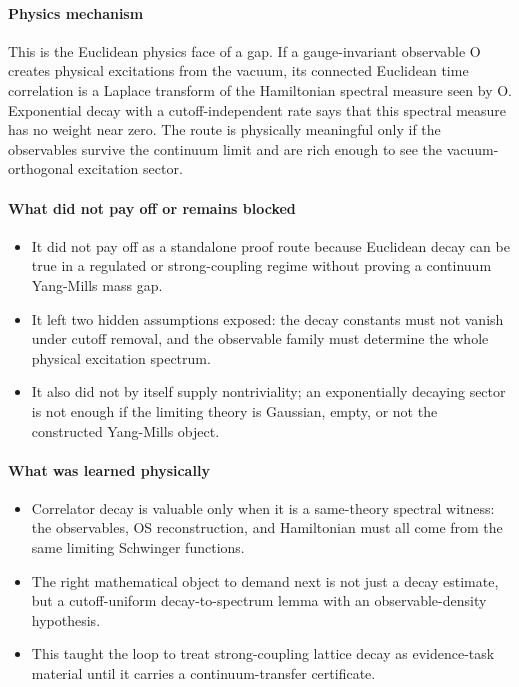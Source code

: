 \documentclass[11pt]{article}
\begin{document}
\paragraph{Physics mechanism}

This is the Euclidean physics face of a gap. If a gauge-invariant observable O creates physical excitations from the vacuum, its connected Euclidean time correlation is a Laplace transform of the Hamiltonian spectral measure seen by O. Exponential decay with a cutoff-independent rate says that this spectral measure has no weight near zero. The route is physically meaningful only if the observables survive the continuum limit and are rich enough to see the vacuum-orthogonal excitation sector.

\paragraph{What did not pay off or remains blocked}

\begin{itemize}
\item It did not pay off as a standalone proof route because Euclidean decay can be true in a regulated or strong-coupling regime without proving a continuum Yang-Mills mass gap.
\item It left two hidden assumptions exposed: the decay constants must not vanish under cutoff removal, and the observable family must determine the whole physical excitation spectrum.
\item It also did not by itself supply nontriviality; an exponentially decaying sector is not enough if the limiting theory is Gaussian, empty, or not the constructed Yang-Mills object.
\end{itemize}

\paragraph{What was learned physically}

\begin{itemize}
\item Correlator decay is valuable only when it is a same-theory spectral witness: the observables, OS reconstruction, and Hamiltonian must all come from the same limiting Schwinger functions.
\item The right mathematical object to demand next is not just a decay estimate, but a cutoff-uniform decay-to-spectrum lemma with an observable-density hypothesis.
\item This taught the loop to treat strong-coupling lattice decay as evidence-task material until it carries a continuum-transfer certificate.
\end{itemize}
\end{document}
